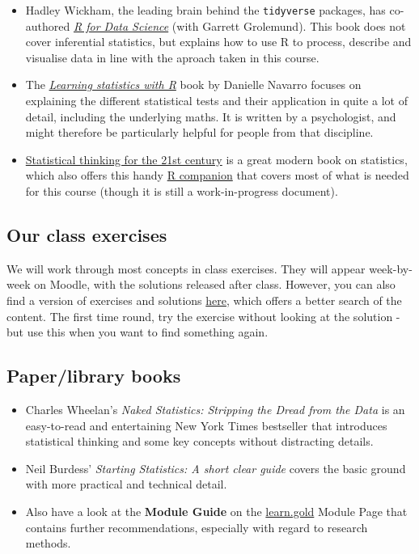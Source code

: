 \documentclass[
]{book}
\providecommand{\tightlist}{%
  \setlength{\itemsep}{0pt}\setlength{\parskip}{0pt}}
\begin{document}
\begin{itemize}
\tightlist
\item
  Hadley Wickham, the leading brain behind the \texttt{tidyverse} packages, has co-authored \href{https://r4ds.had.co.nz/index.html}{\emph{R for Data Science}} (with Garrett Grolemund). This book does not cover inferential statistics, but explains how to use R to process, describe and visualise data in line with the aproach taken in this course.
\item
  The \href{https://learningstatisticswithr.com/book/}{\emph{Learning statistics with R}} book by Danielle Navarro focuses on explaining the different statistical tests and their application in quite a lot of detail, including the underlying maths. It is written by a psychologist, and might therefore be particularly helpful for people from that discipline.
\item
  \href{https://statsthinking21.github.io/statsthinking21-core-site/}{Statistical thinking for the 21st century} is a great modern book on statistics, which also offers this handy \href{https://statsthinking21.github.io/statsthinking21-R-site/index.html}{R companion} that covers most of what is needed for this course (though it is still a work-in-progress document).
\end{itemize}

\hypertarget{our-class-exercises}{%
\subsection{Our class exercises}\label{our-class-exercises}}

We will work through most concepts in class exercises. They will appear week-by-week on Moodle, with the solutions released after class. However, you can also find a version of exercises and solutions \href{https://github.com/LukasWallrich/GoldCoreQuants-materials}{here}, which offers a better search of the content. The first time round, try the exercise without looking at the solution - but use this when you want to find something again.

\hypertarget{paperlibrary-books}{%
\subsection{Paper/library books}\label{paperlibrary-books}}

\begin{itemize}
\tightlist
\item
  Charles Wheelan's \emph{Naked Statistics: Stripping the Dread from the Data} is an easy-to-read and entertaining New York Times bestseller that introduces statistical thinking and some key concepts without distracting details.
\item
  Neil Burdess' \emph{Starting Statistics: A short clear guide} covers the basic ground with more practical and technical detail.
\item
  Also have a look at the \textbf{Module Guide} on the \href{https://learn.gold.ac.uk/}{learn.gold} Module Page that contains further recommendations, especially with regard to research methods.
\end{itemize}
\end{document}
